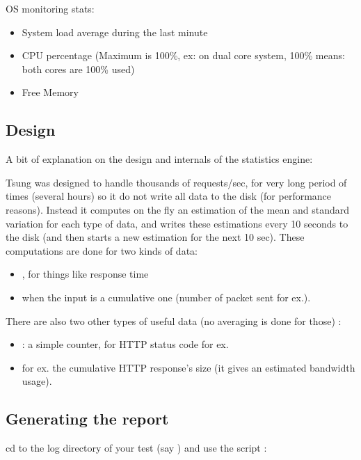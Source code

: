 \documentclass{TSUNG-en}
\begin{document}
OS monitoring stats:
\begin{itemize}
\item {} System load average during the last minute
\item {} CPU percentage (Maximum is 100\%, ex: on dual core
  system, 100\% means: both cores are 100\% used)
\item {} Free Memory
\end{itemize}



\subsection{Design}

A bit of explanation on the design and internals of the statistics engine:

Tsung was designed to handle thousands of requests/sec, for very
long period of times (several hours) so it do not write all data to
the disk (for performance reasons). Instead it computes on the fly an
estimation of the mean and standard variation for each type of data,
and writes these estimations every 10 seconds to the disk (and then
starts a new estimation for the next 10 sec). These computations are
done for two kinds of data:
\begin{itemize}
\item {}, for things like response time
\item {} when the input is a cumulative one (number of
packet sent for ex.).
\end{itemize}

There are also two other types of useful data (no averaging is done for
those) :
\begin{itemize}
\item {}: a simple counter, for HTTP status code for ex.
\item {} for ex. the cumulative HTTP response's size (it gives an
estimated bandwidth usage).
\end{itemize}



\subsection{Generating the report}

cd to the log directory of your test (say
) and use the script
:
\end{document}
